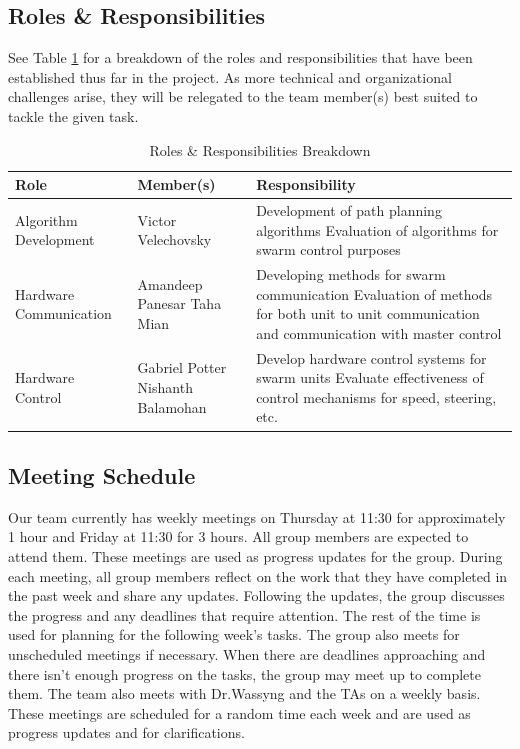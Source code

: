 \documentclass[11pt]{article}
\begin{document}
\subsection{Roles \& Responsibilities}
See Table \ref{rr} for a breakdown of the roles and responsibilities that have been established thus far in the project. As more technical and organizational challenges arise, they will be relegated to the team member(s) best suited to tackle the given task.
\begin{table}[H]
\centering
\caption{Roles \& Responsibilities Breakdown}
\label{rr}
\begin{tabularx}{\textwidth}{| l | p{4cm} | X |}
\hline
Role & Member(s) & Responsibility \\ \hline
Algorithm Development & Victor Velechovsky & Development of path planning algorithms \newline Evaluation of algorithms for swarm control purposes  \newline \\ \hline
Hardware Communication & Amandeep Panesar \newline Taha Mian & Developing methods for swarm communication \newline Evaluation of methods for both unit to unit communication and communication with master control \newline \\ \hline
Hardware Control & Gabriel Potter \newline Nishanth Balamohan & Develop hardware control systems for swarm units \newline Evaluate effectiveness of control mechanisms for speed, steering, etc. \\ \hline
\end{tabularx}
\end{table}
\subsection{Meeting Schedule}
Our team currently has weekly meetings on Thursday at 11:30 for approximately 1 hour and Friday at 11:30 for 3 hours. All group members are expected to attend them. These meetings are used as progress updates for the group. During each meeting, all group members reflect on the work that they have completed in the past week and share any updates. Following the updates, the group discusses the progress and any deadlines that require attention. The rest of the time is used for planning for the following week's tasks. The group also meets for unscheduled meetings if necessary. When there are deadlines approaching and there isn't enough progress on the tasks, the group may meet up to complete them. The team also meets with Dr.Wassyng and the TAs on a weekly basis. These meetings are scheduled for a random time each week and are used as progress updates and for clarifications.
\end{document}
